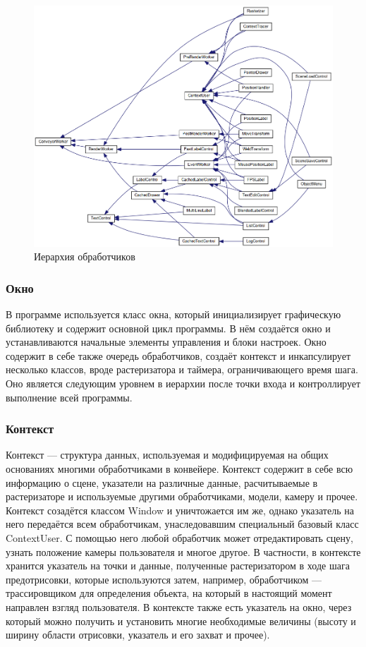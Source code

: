 \documentclass[a4paper,12pt]{report}
\numberwithin{equation}{section}
\begin{document}
\begin{figure}[!h]
\centering
\includegraphics[width=\textwidth]{inherit_graph_73}
\caption{Иерархия обработчиков}
\label{conveyor_hierarchy_dia}
\end{figure}

\subsubsection{Окно}
В программе используется класс окна, который инициализирует графическую библиотеку и содержит основной цикл программы. В нём создаётся окно и устанавливаются начальные элементы управления и блоки настроек. Окно содержит в себе также очередь обработчиков, создаёт контекст и инкапсулирует несколько классов, вроде растеризатора и таймера, ограничивающего время шага. Оно является следующим уровнем в иерархии после точки входа и контроллирует выполнение всей программы.

\subsubsection{Контекст}
Контекст --- структура данных, используемая и модифицируемая на общих основаниях многими обработчиками в конвейере. Контекст содержит в себе всю информацию о сцене, указатели на различные данные, расчитываемые в растеризаторе и используемые другими обработчиками, модели, камеру и прочее. Контекст созадётся классом Window и уничтожается им же, однако указатель на него передаётся всем обработчикам, унаследовавшим специальный базовый класс ContextUser. С помощью него любой обработчик может отредактировать сцену, узнать положение камеры пользователя и многое другое. В частности, в контексте хранится указатель на точки и данные, полученные растеризатором в ходе шага предотрисовки, которые используются затем, например, обработчиком --- трассировщиком для определения объекта, на который в настоящий момент направлен взгляд пользователя. В контексте также есть указатель на окно, через который можно получить и установить многие необходимые величины (высоту и ширину области отрисовки, указатель и его захват и прочее).
\end{document}
